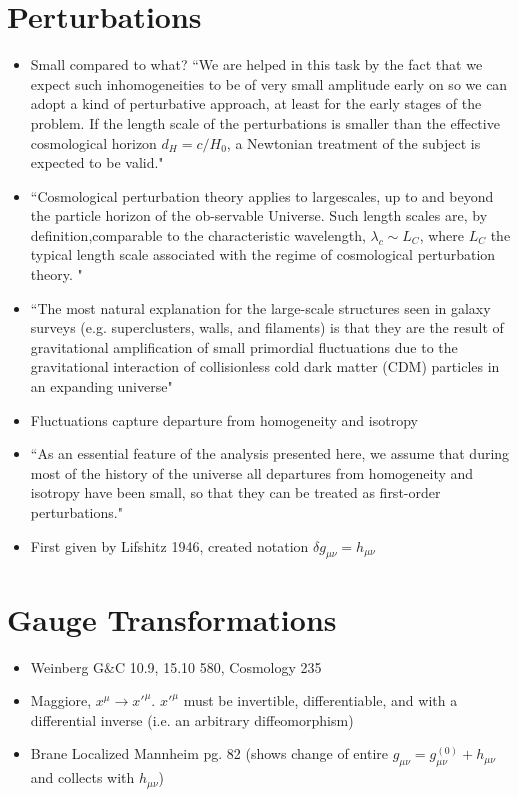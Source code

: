 \documentclass[10pt,letterpaper]{article}
\numberwithin{equation}{section}
\begin{document}
\section*{Perturbations}
\begin{itemize}
	\item Small compared to what? ``We are helped in this task by the fact that we expect such inhomogeneities to be of very small amplitude early on so we can adopt a kind of perturbative approach, at least for the early stages of the problem. If the length scale of the perturbations is smaller than the effective cosmological horizon $d_H = c / H_0$, a Newtonian treatment of the subject is expected to be valid."
	\item ``Cosmological   perturbation   theory   applies   to   largescales, up to and beyond the particle horizon of the ob-servable Universe.  Such length scales are, by definition,comparable  to  the  characteristic  wavelength, $\lambda_c \sim L_C$, where $L_C$ the typical length scale associated with the regime of cosmological perturbation theory. "
	\item ``The most natural explanation for the large-scale structures seen in galaxy surveys (e.g. superclusters, walls, and filaments) is that they are the result of gravitational amplification of small primordial fluctuations due to the gravitational interaction of collisionless cold dark matter (CDM) particles in an expanding universe"
	\item Fluctuations capture departure from homogeneity and isotropy
	\item ``As an essential feature of the analysis presented here, we assume that during most of the history of the universe all departures from homogeneity and isotropy have been small, so that they can be treated as first-order perturbations."
	\item First given by Lifshitz 1946, created notation $\delta g_{\mu\nu} = h_{\mu\nu}$
	\end{itemize}
	
\section*{Gauge Transformations}
\begin{itemize}	
	\item Weinberg G\&C 10.9, 15.10 580, Cosmology 235
	\item Maggiore, $x^\mu \to x'^\mu$. $x'^\mu$ must be invertible, differentiable, and with a differential inverse (i.e. an arbitrary diffeomorphism)
	\item Brane Localized Mannheim pg. 82 (shows change of entire $g_{\mu\nu} = g_{\mu\nu}^{(0)}+h_{\mu\nu}$ and collects with $h_{\mu\nu}$)
\end{itemize}
\end{document}
